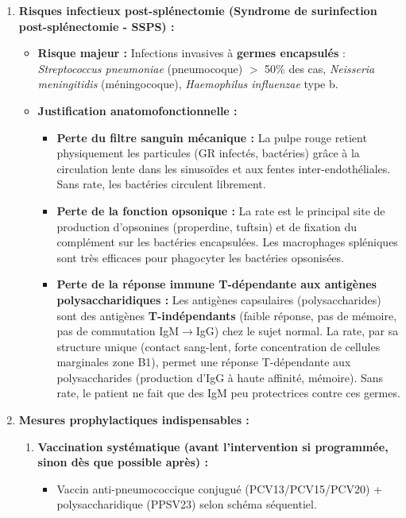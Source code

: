 \documentclass[11pt]{article}
\begin{document}
\begin{exoresolu}
\begin{enumerate}
\begin{itemize}
        \end{itemize}
        \item \textbf{Risques infectieux post-splénectomie (Syndrome de surinfection post-splénectomie - SSPS) :}
        \begin{itemize}
            \item \textbf{Risque majeur :} Infections invasives à \textbf{germes encapsulés} : \emph{Streptococcus pneumoniae} (pneumocoque) $>$ 50\% des cas, \emph{Neisseria meningitidis} (méningocoque), \emph{Haemophilus influenzae} type b.
            \item \textbf{Justification anatomofonctionnelle :}
                \begin{itemize}
                    \item \textbf{Perte du filtre sanguin mécanique :} La pulpe rouge retient physiquement les particules (GR infectés, bactéries) grâce à la circulation lente dans les sinusoïdes et aux fentes inter-endothéliales. Sans rate, les bactéries circulent librement.
                    \item \textbf{Perte de la fonction opsonique :} La rate est le principal site de production d'opsonines (properdine, tuftsin) et de fixation du complément sur les bactéries encapsulées. Les macrophages spléniques sont très efficaces pour phagocyter les bactéries opsonisées.
                    \item \textbf{Perte de la réponse immune T-dépendante aux antigènes polysaccharidiques :} Les antigènes capsulaires (polysaccharides) sont des antigènes \textbf{T-indépendants} (faible réponse, pas de mémoire, pas de commutation IgM$\rightarrow$IgG) chez le sujet normal. La rate, par sa structure unique (contact sang-lent, forte concentration de cellules marginales zone B1), permet une réponse T-dépendante aux polysaccharides (production d'IgG à haute affinité, mémoire). Sans rate, le patient ne fait que des IgM peu protectrices contre ces germes.
                \end{itemize}
        \end{itemize}
        \item \textbf{Mesures prophylactiques indispensables :}
        \begin{enumerate}
            \item \textbf{Vaccination systématique (avant l'intervention si programmée, sinon dès que possible après) :}
                \begin{itemize}
                    \item Vaccin anti-pneumococcique conjugué (PCV13/PCV15/PCV20) + polysaccharidique (PPSV23) selon schéma séquentiel.

\end{itemize}
\end{enumerate}
\end{enumerate}
\end{exoresolu}
\end{document}
